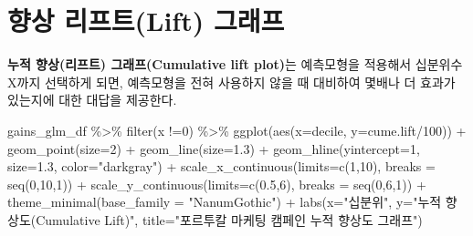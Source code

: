 \documentclass[
  letterpaper,
  chapter,a4paper,showtrims,openright,hidelinks]{oblivoir}
\newenvironment{Shaded}{\begin{snugshade}}{\end{snugshade}}
\newcommand{\AttributeTok}[1]{\textcolor[rgb]{0.40,0.45,0.13}{#1}}
\newcommand{\DecValTok}[1]{\textcolor[rgb]{0.68,0.00,0.00}{#1}}
\newcommand{\FloatTok}[1]{\textcolor[rgb]{0.68,0.00,0.00}{#1}}
\newcommand{\FunctionTok}[1]{\textcolor[rgb]{0.28,0.35,0.67}{#1}}
\newcommand{\NormalTok}[1]{\textcolor[rgb]{0.00,0.23,0.31}{#1}}
\newcommand{\SpecialCharTok}[1]{\textcolor[rgb]{0.37,0.37,0.37}{#1}}
\newcommand{\StringTok}[1]{\textcolor[rgb]{0.13,0.47,0.30}{#1}}
\begin{document}
\hypertarget{predictive-model-caret-business-lift}{%
\section{향상 리프트(Lift)
그래프}\label{predictive-model-caret-business-lift}}

\textbf{누적 향상(리프트) 그래프(Cumulative lift plot)}는 예측모형을
적용해서 십분위수 X까지 선택하게 되면, 예측모형을 전혀 사용하지 않을 때
대비하여 몇배나 더 효과가 있는지에 대한 대답을 제공한다.

\begin{Shaded}
\begin{Highlighting}[]
\NormalTok{gains\_glm\_df }\SpecialCharTok{\%\textgreater{}\%} 
    \FunctionTok{filter}\NormalTok{(x }\SpecialCharTok{!=}\DecValTok{0}\NormalTok{) }\SpecialCharTok{\%\textgreater{}\%} 
    \FunctionTok{ggplot}\NormalTok{(}\FunctionTok{aes}\NormalTok{(}\AttributeTok{x=}\NormalTok{decile, }\AttributeTok{y=}\NormalTok{cume.lift}\SpecialCharTok{/}\DecValTok{100}\NormalTok{)) }\SpecialCharTok{+}
      \FunctionTok{geom\_point}\NormalTok{(}\AttributeTok{size=}\DecValTok{2}\NormalTok{) }\SpecialCharTok{+}
      \FunctionTok{geom\_line}\NormalTok{(}\AttributeTok{size=}\FloatTok{1.3}\NormalTok{) }\SpecialCharTok{+}
      \FunctionTok{geom\_hline}\NormalTok{(}\AttributeTok{yintercept=}\DecValTok{1}\NormalTok{, }\AttributeTok{size=}\FloatTok{1.3}\NormalTok{, }\AttributeTok{color=}\StringTok{"darkgray"}\NormalTok{) }\SpecialCharTok{+}
      \FunctionTok{scale\_x\_continuous}\NormalTok{(}\AttributeTok{limits=}\FunctionTok{c}\NormalTok{(}\DecValTok{1}\NormalTok{,}\DecValTok{10}\NormalTok{), }\AttributeTok{breaks =} \FunctionTok{seq}\NormalTok{(}\DecValTok{0}\NormalTok{,}\DecValTok{10}\NormalTok{,}\DecValTok{1}\NormalTok{)) }\SpecialCharTok{+}
      \FunctionTok{scale\_y\_continuous}\NormalTok{(}\AttributeTok{limits=}\FunctionTok{c}\NormalTok{(}\FloatTok{0.5}\NormalTok{,}\DecValTok{6}\NormalTok{), }\AttributeTok{breaks =} \FunctionTok{seq}\NormalTok{(}\DecValTok{0}\NormalTok{,}\DecValTok{6}\NormalTok{,}\DecValTok{1}\NormalTok{)) }\SpecialCharTok{+}
      \FunctionTok{theme\_minimal}\NormalTok{(}\AttributeTok{base\_family =} \StringTok{"NanumGothic"}\NormalTok{) }\SpecialCharTok{+}
      \FunctionTok{labs}\NormalTok{(}\AttributeTok{x=}\StringTok{"십분위"}\NormalTok{, }\AttributeTok{y=}\StringTok{"누적 향상도(Cumulative Lift)"}\NormalTok{, }\AttributeTok{title=}\StringTok{"포르투칼 마케팅 캠페인 누적 향상도 그래프"}\NormalTok{) }
\end{Highlighting}
\end{Shaded}
\end{document}
